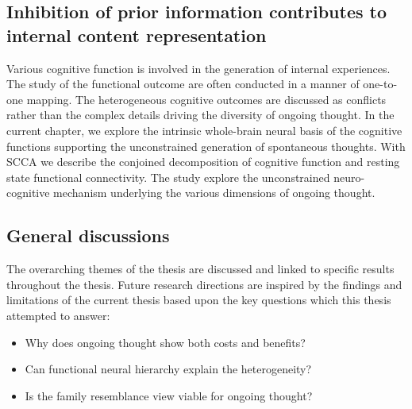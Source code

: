\subsection*{Inhibition of prior information contributes to internal content representation}
Various cognitive function is involved in the generation of internal experiences. The study of the functional outcome are often conducted in a manner of one-to-one mapping. The heterogeneous cognitive outcomes are discussed as conflicts rather than the complex details driving the diversity of ongoing thought. In the current chapter, we explore the intrinsic whole-brain neural basis of the cognitive functions supporting the unconstrained generation of spontaneous thoughts.  With SCCA we describe the conjoined decomposition of cognitive function and resting state functional connectivity. The study explore the unconstrained neuro-cognitive mechanism underlying the various dimensions of ongoing thought.

\subsection*{General discussions}
The overarching themes of the thesis are discussed and linked to specific results throughout the thesis. Future research directions are inspired by the findings and limitations of the current thesis based upon the key questions which this thesis attempted to answer:

\begin{itemize}
    \item Why does ongoing thought show both costs and benefits? 
    \item Can functional neural hierarchy explain the heterogeneity?
    \item Is the family resemblance view viable for ongoing thought?
\end{itemize}


